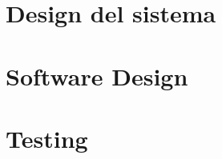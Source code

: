 \documentclass[12pt,a4paper]{article}
\begin{document}
\newpage


\newpage


\newpage
\section{Design del sistema}


\section{Software Design}


\newpage


\newpage


\newpage


\newpage
\section{Testing}


\newpage


\newpage

\end{document}
